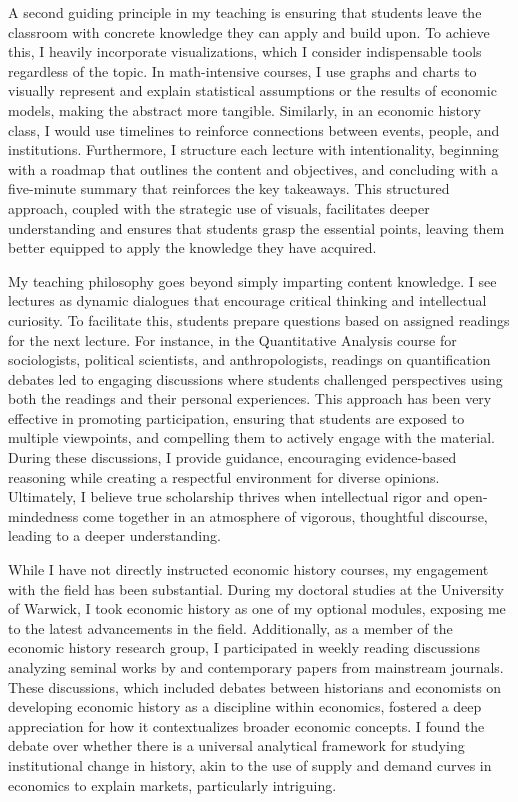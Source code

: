 \documentclass{article}
\begin{document}
\medskip


A second guiding principle in my teaching is ensuring that students leave the classroom with concrete knowledge they can apply and build upon. To achieve this, I heavily incorporate visualizations, which I consider indispensable tools regardless of the topic. In math-intensive courses, I use graphs and charts to visually represent and explain statistical assumptions or the results of economic models, making the abstract more tangible. Similarly, in an economic history class, I would use timelines to reinforce connections between events, people, and institutions. Furthermore, I structure each lecture with intentionality, beginning with a roadmap that outlines the content and objectives, and concluding with a five-minute summary that reinforces the key takeaways. This structured approach, coupled with the strategic use of visuals, facilitates deeper understanding and ensures that students grasp the essential points, leaving them better equipped to apply the knowledge they have acquired.

\medskip

My teaching philosophy goes beyond simply imparting content knowledge. I see lectures as dynamic dialogues that encourage critical thinking and intellectual curiosity. To facilitate this, students prepare questions based on assigned readings for the next lecture. For instance, in the Quantitative Analysis course for sociologists, political scientists, and anthropologists, readings on quantification debates led to engaging discussions where students challenged perspectives using both the readings and their personal experiences. This approach has been very effective in promoting participation, ensuring that students are exposed to multiple viewpoints, and compelling them to actively engage with the material. During these discussions, I provide guidance, encouraging evidence-based reasoning while creating a respectful environment for diverse opinions. Ultimately, I believe true scholarship thrives when intellectual rigor and open-mindedness come together in an atmosphere of vigorous, thoughtful discourse, leading to a deeper understanding.

\medskip

While I have not directly instructed economic history courses, my engagement with the field has been substantial. During my doctoral studies at the University of Warwick, I took economic history as one of my optional modules, exposing me to the latest advancements in the field. Additionally, as a member of the economic history research group, I participated in weekly reading discussions analyzing seminal works by and contemporary papers from mainstream journals. These discussions, which included debates between historians and economists on developing economic history as a discipline within economics, fostered a deep appreciation for how it contextualizes broader economic concepts. I found the debate over whether there is a universal analytical framework for studying institutional change in history, akin to the use of supply and demand curves in economics to explain markets, particularly intriguing.
\end{document}

